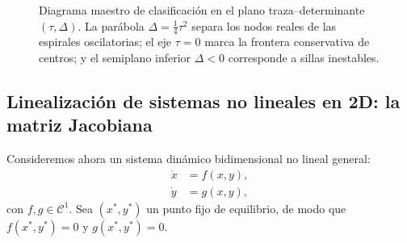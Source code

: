 \begin{figure}[htbp]
\caption{Diagrama maestro de clasificación en el plano traza--determinante $(\tau, \Delta)$. La parábola $\Delta = \frac{1}{4}\tau^2$ separa los nodos reales de las espirales oscilatorias; el eje $\tau = 0$ marca la frontera conservativa de centros; y el semiplano inferior $\Delta < 0$ corresponde a sillas inestables.}
\label{fig:mapa_tr_det}
\end{figure}

\subsection{Linealización de sistemas no lineales en 2D: la matriz Jacobiana}

Consideremos ahora un sistema dinámico bidimensional no lineal general:
\begin{equation}
\begin{aligned}
    \dot{x} &= f(x, y), \\
    \dot{y} &= g(x, y),
\end{aligned}
\label{eq:sistema_no_lineal_2d}
\end{equation}
con $f, g \in \mathcal{C}^1$. Sea $(x^*, y^*)$ un punto fijo de equilibrio, de modo que $f(x^*, y^*) = 0$ y $g(x^*, y^*) = 0$.


